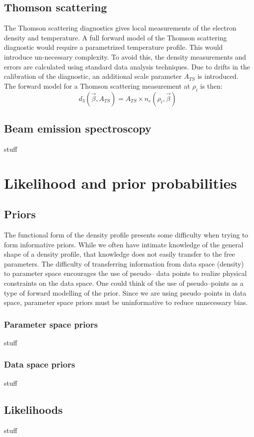 \documentclass[12pt]{article}
\numberwithin{equation}{section}
\begin{document}
\subsection{Thomson scattering}
The Thomson scattering diagnostics gives local measurements of the electron density and temperature. A full forward model of the Thomson scattering diagnostic would require a parametrized temperature profile. This would introduce un-necessary complexity. To avoid this, the density measurements and errors are calculated using standard data analysis techniques. Due to drifts in the calibration of the diagnostic, an additional scale parameter $A_{TS}$ is introduced. The forward model for a Thomson scattering measurement at $\rho_i$ is then:
\begin{equation} \label{eq:thom_model}
	d_3(\vec{\beta},A_{TS}) = A_{TS} \times n_{e}(\rho_i,\vec{\beta})
\end{equation}
\subsection{Beam emission spectroscopy}
stuff
\section{Likelihood and prior probabilities}
\subsection{Priors}
The functional form of the density profile presents some difficulty when 
trying to form informative priors. While we often have intimate knowledge of 
the general shape of a density profile, that knowledge does not easily 
transfer to the free parameters. The difficulty of transferring information 
from data space (density) to parameter space encourages the use of pseudo--
data points to realize physical constraints on the data space. One could 
think of the use of pseudo--points as a type of forward modelling of the 
prior. Since we are using pseudo--points in data space, parameter space 
priors must be uninformative to reduce unnecessary bias. 
\subsubsection{Parameter space priors}
stuff
\subsubsection{Data space priors}
stuff
\subsection{Likelihoods}
stuff
\end{document}

